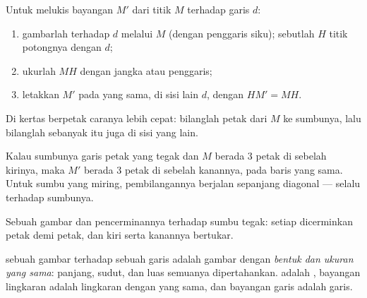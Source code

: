 \begin{method}\label{met:g6:symmetry:construct}
Untuk melukis bayangan $M'$ dari titik $M$ terhadap garis $d$:
\begin{enumerate}
  \item gambarlah  terhadap $d$ melalui $M$ (dengan
        penggaris siku); sebutlah $H$ titik potongnya dengan $d$;
  \item ukurlah $MH$ dengan jangka atau penggaris;
  \item letakkan $M'$ pada  yang sama, di sisi lain
        $d$, dengan $HM' = MH$.
\end{enumerate}
Di kertas berpetak caranya lebih cepat: bilanglah petak dari $M$ ke
sumbunya, lalu bilanglah sebanyak itu juga di sisi yang lain.
\end{method}

\begin{example}\label{ex:g6:symmetry:grid}
Kalau sumbunya garis petak yang tegak dan $M$ berada $3$ petak di
sebelah kirinya, maka $M'$ berada $3$ petak di sebelah kanannya, pada
baris yang sama. Untuk sumbu yang miring, pembilangannya berjalan
sepanjang diagonal --- selalu  terhadap sumbunya.
\end{example}

\begin{omfigure}

{\small Sebuah gambar dan pencerminannya terhadap sumbu tegak: setiap
 dicerminkan petak demi petak, dan kiri serta kanannya bertukar.}
\end{omfigure}

\begin{proposition}\label{prop:g6:symmetry:preserved}
 sebuah gambar terhadap sebuah garis adalah gambar dengan
\emph{bentuk dan ukuran yang sama}: panjang, sudut,  dan luas
semuanya dipertahankan.   adalah ,
bayangan lingkaran adalah lingkaran dengan  yang sama, dan
bayangan garis adalah garis.
\end{proposition}
\admitted

